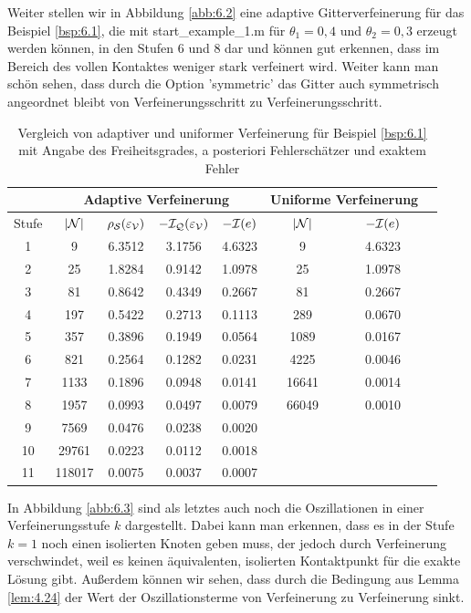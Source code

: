 \begin{bsp}
Weiter stellen wir in Abbildung \ref{abb:6.2} eine adaptive Gitterverfeinerung für das Beispiel \ref{bsp:6.1}, die mit {\ttfamily start_example_1.m} für $\theta_1 = 0,4$ und $\theta_2 = 0,3$ erzeugt werden können, in den Stufen 6 und 8 dar und können gut erkennen, dass im Bereich des vollen Kontaktes weniger stark verfeinert wird. Weiter kann man schön sehen, dass durch die Option {\ttfamily 'symmetric'} das Gitter auch symmetrisch angeordnet bleibt von Verfeinerungsschritt zu Verfeinerungsschritt.


\begin{table}[h]
\centering
\begin{tabular}[c]{|c|c|c|c|c|c|c|c|}
	\hline
	 & \multicolumn{4}{c|}{Adaptive Verfeinerung} & \multicolumn{2}{c|}{Uniforme Verfeinerung} \\
	\hline
	Stufe & $\lvert \mathcal N\rvert$ & $\rho_{\mathcal S}(\varepsilon_{\mathcal V})$ & $-\mathcal I_{\mathcal Q} (\varepsilon_{\mathcal V})$ & $-\mathcal I(e)$ & $\lvert \mathcal N\rvert$ & $-\mathcal I (e)$ \\
	\hline
	 1 &  9  & 6.3512 & 3.1756 & 4.6323 & 9  & 4.6323 \\
	 2 & 25 & 1.8284 & 0.9142 & 1.0978 & 25 & 1.0978 \\
	 3 & 81 & 0.8642 & 0.4349 & 0.2667 & 81 & 0.2667 \\
	 4 & 197 & 0.5422 &0.2713 & 0.1113 & 289 & 0.0670 \\
	 5 & 357 & 0.3896 & 0.1949 & 0.0564 & 1089 &0.0167  \\
	 6 & 821 & 0.2564 & 0.1282 & 0.0231 &4225 &  0.0046 \\
	 7 & 1133 & 0.1896 & 0.0948 & 0.0141 & 16641 & 0.0014 \\
	 8 & 1957 & 0.0993 & 0.0497 & 0.0079 & 66049 & 0.0010 \\
	 9 & 7569 & 0.0476 & 0.0238 & 0.0020 & & \\
	 10 & 29761 & 0.0223 & 0.0112 & 0.0018 & & \\
	 11 & 118017 & 0.0075 & 0.0037 & 0.0007 & & \\
	\hline
\end{tabular}
\caption[Vergleich von adaptiver und uniformer Verfeinerung für Beispiel \ref{bsp:6.1}]{\label{tab:6.1}Vergleich von adaptiver und uniformer Verfeinerung für Beispiel \ref{bsp:6.1} mit Angabe des Freiheitsgrades, a posteriori Fehlerschätzer und exaktem Fehler}
\end{table}


In Abbildung \ref{abb:6.3} sind als letztes auch noch die Oszillationen in einer Verfeinerungsstufe $k$ dargestellt. Dabei kann man erkennen, dass es in der Stufe $k=1$ noch einen isolierten Knoten geben muss, der jedoch durch Verfeinerung verschwindet, weil es keinen äquivalenten, isolierten Kontaktpunkt für die exakte Lösung gibt. Außerdem können wir sehen, dass durch die Bedingung aus Lemma \ref{lem:4.24} der Wert der Oszillationsterme von Verfeinerung zu Verfeinerung sinkt.




\end{bsp}
